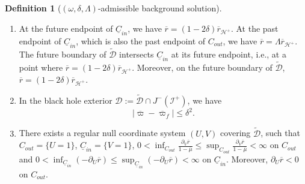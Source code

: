 \documentclass[10pt, reqno]{amsart}
\theoremstyle{definition}
\newtheorem{definition}[theorem]{Definition}
\theoremstyle{remark}
\theoremstyle{conjecture}
\numberwithin{equation}{section}
\newcommand{\set}[1]{\{#1\}}
\newcommand{\rd}{\partial}
\newcommand{\0}{\emptyset}
\newcommand{\dlt}{\delta}
\newcommand{\Lmb}{\Lambda}
\newcommand{\omg}{\omega}
\newcommand{\calD}{\mathcal D}
\newcommand{\calH}{\mathcal H}
\newcommand{\calI}{\mathcal I}
\newcommand{\uC}{\underline{C}}
\newcommand{\de}{\delta}
\newcommand{\EH}{\calH^{+}}
\newcommand{\rbg}{\overline{r}}					%
\newcommand{\varpibg}{\overline{\varpi}}				%
\newcommand{\mubg}{\overline{\mu}}				%
\newcommand{\Abs}[1]{\left\vert #1 \right\vert}
\begin{document}
\begin{definition} [$(\omg, \dlt, \Lambda)$-admissible background solution]
\begin{enumerate}
\item At the future endpoint of $\uC_{in}$, we have $\rbg = (1- 2\dlt) \rbg_{\EH}$. 
At the past endpoint of $\uC_{in}$, which is also the past endpoint of $C_{out}$, we have $\rbg = \Lmb \rbg_{\EH}$. The future boundary of $\widetilde{\calD}$ intersects $\uC_{in}$ at its future endpoint, i.e., at a point where $\rbg= (1-2\dlt) \rbg_{\EH}$. Moreover, on the future boundary of $\widetilde{\calD}$, $\rbg = (1-2\de) \rbg_{\EH}$.

\item In the black hole exterior $\calD := \widetilde{\calD} \cap J^{-}(\calI^{+})$, we have
\begin{equation} \label{eq:dlt-adm:m}
	\Abs{\varpibg - \varpibg_{f}} \leq \dlt^{2}.
\end{equation}

\item There exists a regular null coordinate system $(U, V)$ covering $\widetilde{\calD}$, such that $C_{out} = \set{U = 1}$, $\uC_{in} = \set{V = 1}$, $0 < \inf_{C_{out}} \frac{\rd_{V} \rbg}{1-\mubg} \leq \sup_{C_{out}} \frac{\rd_{V} \rbg}{1-\mubg} < \infty$ on $C_{out}$ and $0 < \inf_{\uC_{in}} (-\rd_{U} \rbg) \leq \sup_{\uC_{in}} (- \rd_{U} \rbg) < \infty$ on $\uC_{in}$. Moreover, $\rd_{U} \rbg < 0$ on $C_{out}$. 


\end{enumerate}
\end{definition}
\end{document}
